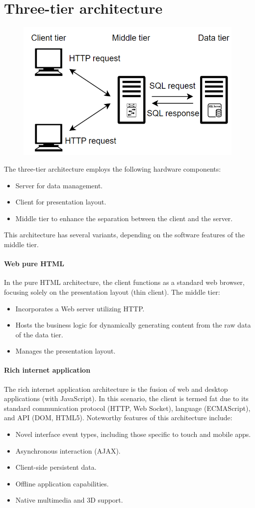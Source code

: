 \section{Three-tier architecture}

\begin{figure}[H]
    \centering
    \includegraphics[width=0.35\linewidth]{images/ttph.png}
\end{figure}
The three-tier architecture employs the following hardware components:
\begin{itemize}
    \item Server for data management. 
    \item Client for presentation layout. 
    \item Middle tier to enhance the separation between the client and the server.
\end{itemize}
This architecture has several variants, depending on the software features of the middle tier. 

\paragraph*{Web pure HTML}
In the pure HTML architecture, the client functions as a standard web browser, focusing solely on the presentation layout (thin client). 
The middle tier:
\begin{itemize}
    \item Incorporates a Web server utilizing HTTP.
    \item Hosts the business logic for dynamically generating content from the raw data of the data tier. 
    \item Manages the presentation layout.
\end{itemize}

\paragraph*{Rich internet application}
The rich internet application architecture is the fusion of web and desktop applications (with JavaScript). 
In this scenario, the client is termed fat due to its standard communication protocol (HTTP, Web Socket), language (ECMAScript), and API (DOM, HTML5). 
Noteworthy features of this architecture include:
\begin{itemize}
    \item Novel interface event types, including those specific to touch and mobile apps.
    \item Asynchronous interaction (AJAX).
    \item Client-side persistent data.
    \item Offline application capabilities.
    \item Native multimedia and 3D support.
\end{itemize}